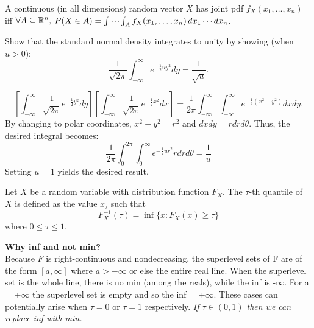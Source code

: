 \documentclass[DIV=14,titlepage=false]{scrreprt}
\begin{document}
A continuous (in all dimensions) random vector $ X $ has joint pdf $ f_X(x_1, \dotsc, x_n) $ iff $ \forall A \subseteq \mathbb{R}^n, $ $ P(X \in A) = \idotsint_A f_X(x_1, \dotsc, x_n) \, dx_1 \dotsm dx_n $.
\vspace{5pt}
\begin{exercise}
  Show that the standard normal density integrates to unity by showing (when \( u > 0 \)):
  \[
\frac{1}{\sqrt{2\pi}} \int_{-\infty}^{\infty} e^{-\frac{1}{2}u y^2} dy = \frac{1}{\sqrt{u}}.
\]
\end{exercise}
\begin{solution}
\[\left[
\int_{-\infty}^{\infty} \frac{1}{\sqrt{2\pi}} e^{-\frac{1}{2}y^2} dy
\right]
\left[
\int_{-\infty}^{\infty} \frac{1}{\sqrt{2\pi}} e^{-\frac{1}{2}x^2} dx
\right] 
= \frac{1}{2\pi} \int_{-\infty}^{\infty} \int_{-\infty}^{\infty} e^{-\frac{1}{2}(x^2+y^2)} dxdy.
\]
By changing to polar coordinates, $x^2+y^2=r^2$ and $dxdy=rdrd\theta$. Thus, the desired integral becomes:
\[ \frac{1}{2\pi} \int_{0}^{2\pi} \int_{0}^{\infty} e^{-\frac{1}{2}ur^2} rdrd\theta = \frac{1}{u}\]
Setting $u=1$ yields the desired result.
\end{solution}
\begin{definition}
  Let \( X \) be a random variable with distribution function \( F_X \). The \(\tau\)-th quantile of \( X \) is defined as the value \( x_\tau \) such that
\[ F_X^{-1}(\tau) = \inf\{ x : F_X(x) \geq \tau \} \]
where \( 0 \leq \tau \leq 1 \).
\end{definition}
\vspace{5pt}
\textbf{Why inf and not min?}\\
Because $F$ is right-continuous and nondecreasing, the superlevel sets of F are of the form $[a,\infty]$ where $a>-\infty$ or else the entire real line. When the superlevel set is the whole line, there is no min (among the reals), while the inf is -$ \infty$. For a = +$ \infty$ the superlevel set is empty and so the inf = +$\infty$. These cases can potentially arise when $\tau=0$ or $\tau = 1$ respectively.
\textit{If $\tau \in (0,1)$ then we can replace inf with min.}
\end{document}
